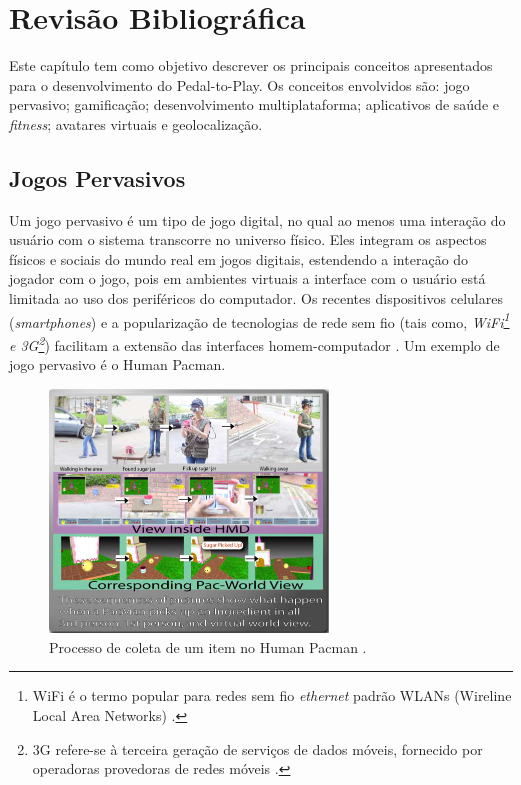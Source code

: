 \chapter{Revisão Bibliográfica} \label{cap:revbib}
Este capítulo tem como objetivo descrever os principais conceitos apresentados para o desenvolvimento do Pedal-to-Play. Os conceitos envolvidos são: jogo pervasivo; gamificação; desenvolvimento multiplataforma; aplicativos de saúde e \textit{fitness}; avatares virtuais e geolocalização.

\section{Jogos Pervasivos}
Um jogo pervasivo é um tipo de jogo digital, no qual ao menos uma interação do usuário com o sistema transcorre no universo físico. Eles integram os aspectos físicos e sociais do mundo real em jogos digitais, estendendo a interação do jogador com o jogo, pois em ambientes virtuais a interface com o usuário está limitada ao uso dos periféricos do computador. Os recentes dispositivos celulares (\textit{smartphones}) e a popularização de tecnologias de rede sem fio 
(tais como, \textit{WiFi\footnote{WiFi é o termo popular para redes sem fio \textit{ethernet} padrão  WLANs (Wireline Local Area Networks) \cite{lehr2003}.} e 3G\footnote{3G refere-se à terceira geração de serviços de dados móveis, fornecido por operadoras provedoras de redes móveis \cite{lehr2003}.}}) facilitam a extensão das interfaces homem-computador \cite{magerkurth2005, vianna2013}. Um exemplo de jogo pervasivo é o Human Pacman. \par

\begin{figure}[h]
    \caption[Processo de coleta de um item no Human Pacman]{Processo de coleta de um item no Human Pacman \cite{cheok2003}.}
    \centerline{\includegraphics[width=20em]{figuras/humanpacman.png}}
    \label{fig:humanpacman}
\end{figure}

